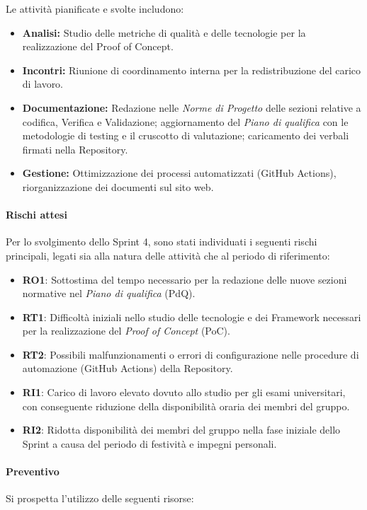 \documentclass[a4paper,12pt]{article}
\begin{document}
Le attività pianificate e svolte includono:
\begin{itemize}
    \item \textbf{Analisi:} Studio delle metriche di qualit\`a e delle tecnologie per la realizzazione del Proof of Concept.
    \item \textbf{Incontri:} Riunione di coordinamento interna per la redistribuzione del carico di lavoro.
    \item \textbf{Documentazione:} Redazione nelle \textit{Norme di Progetto} delle sezioni relative a codifica, Verifica e Validazione; aggiornamento del \textit{Piano di qualifica} con le metodologie di testing e il cruscotto di valutazione; caricamento dei verbali firmati nella Repository.
    \item \textbf{Gestione:} Ottimizzazione dei processi automatizzati (GitHub Actions), riorganizzazione dei documenti sul sito web.
\end{itemize}

\paragraph{Rischi attesi}
Per lo svolgimento dello Sprint 4, sono stati individuati i seguenti rischi principali, legati sia alla natura delle attività che al periodo di riferimento:

\begin{itemize}
    \item \textbf{RO1}: Sottostima del tempo necessario per la redazione delle nuove sezioni normative nel \textit{Piano di qualifica} (PdQ).
    \item \textbf{RT1}: Difficoltà iniziali nello studio delle tecnologie e dei Framework necessari per la realizzazione del \textit{Proof of Concept} (PoC).
    \item \textbf{RT2}: Possibili malfunzionamenti o errori di configurazione nelle procedure di automazione (GitHub Actions) della Repository.
    \item \textbf{RI1}: Carico di lavoro elevato dovuto allo studio per gli esami universitari, con conseguente riduzione della disponibilità oraria dei membri del gruppo.
    \item \textbf{RI2}: Ridotta disponibilità dei membri del gruppo nella fase iniziale dello Sprint a causa del periodo di festività e impegni personali.
\end{itemize}

\paragraph{Preventivo}
Si prospetta l'utilizzo delle seguenti risorse:
\end{document}
